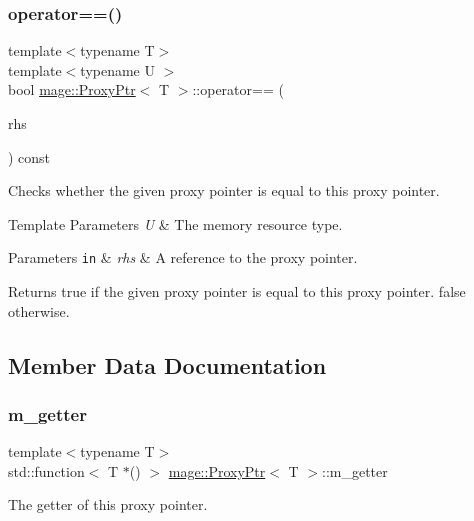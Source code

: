 \subsubsection{\texorpdfstring{operator==()}{operator==()}}
{\footnotesize\ttfamily template$<$typename T$>$ \\
template$<$typename U $>$ \\
bool \hyperlink{classmage_1_1_proxy_ptr}{mage\+::\+Proxy\+Ptr}$<$ T $>$\+::operator== (\begin{DoxyParamCaption}\item[{const \hyperlink{classmage_1_1_proxy_ptr}{Proxy\+Ptr}$<$ U $>$ \&}]{rhs }\end{DoxyParamCaption}) const\hspace{0.3cm}{\ttfamily [noexcept]}}

Checks whether the given proxy pointer is equal to this proxy pointer.


\begin{DoxyTemplParams}{Template Parameters}
{\em U} & The memory resource type. \\
\hline
\end{DoxyTemplParams}

\begin{DoxyParams}[1]{Parameters}
\mbox{\tt in}  & {\em rhs} & A reference to the proxy pointer. \\
\hline
\end{DoxyParams}
\begin{DoxyReturn}{Returns}
{\ttfamily true} if the given proxy pointer is equal to this proxy pointer. {\ttfamily false} otherwise. 
\end{DoxyReturn}


\subsection{Member Data Documentation}
\hypertarget{classmage_1_1_proxy_ptr_a89befb78b9b20192a2966125c5b1d95d}{}\label{classmage_1_1_proxy_ptr_a89befb78b9b20192a2966125c5b1d95d} 
\subsubsection{\texorpdfstring{m\+\_\+getter}{m\_getter}}
{\footnotesize\ttfamily template$<$typename T$>$ \\
std\+::function$<$ T $\ast$() $>$ \hyperlink{classmage_1_1_proxy_ptr}{mage\+::\+Proxy\+Ptr}$<$ T $>$\+::m\+\_\+getter}

The getter of this proxy pointer. 